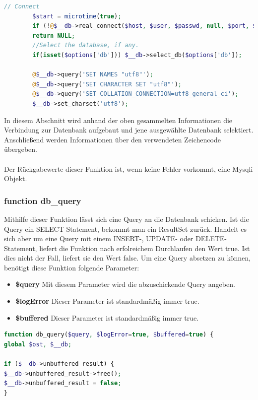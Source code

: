 \begin{lstlisting}[language=PHP, caption=mysqli.php/function-db\_connect4, firstnumber=63]
	    // Connect
	    $start = microtime(true);
	    if (!@$__db->real_connect($host, $user, $passwd, null, $port, $socket))
	    return NULL;
	    //Select the database, if any.
	    if(isset($options['db'])) $__db->select_db($options['db']);
	    
	    @$__db->query('SET NAMES "utf8"');
	    @$__db->query('SET CHARACTER SET "utf8"');
	    @$__db->query('SET COLLATION_CONNECTION=utf8_general_ci');
	    $__db->set_charset('utf8');
\end{lstlisting}
In diesem Abschnitt wird anhand der oben gesammelten Informationen die Verbindung zur Datenbank aufgebaut und jene ausgewählte Datenbank selektiert.\\
Anschließend werden Informationen über den verwendeten Zeichencode übergeben.\\
\\
Der Rückgabewerte dieser Funktion ist, wenn keine Fehler vorkommt, eine Mysqli Objekt. 
\newpage

\subsubsection{function db\_query}

Mithilfe dieser Funktion lässt sich eine Query an die Datenbank schicken. Ist die Query ein SELECT Statement, bekommt man ein ResultSet zurück. Handelt es sich aber um eine Query mit einem INSERT-, UPDATE- oder DELETE- Statement, liefert die Funktion nach erfolreichem Durchlaufen den Wert true. Ist dies nicht der Fall, liefert sie den Wert false. Um eine Query absetzen zu können, benötigt diese Funktion folgende Parameter:
\begin{itemize}
	\item \textbf{\$query} Mit diesem Parameter wird die abzuschickende Query angeben.
	\item \textbf{\$logError} Dieser Parameter ist standardmäßig immer true.
	\item \textbf{\$buffered} Dieser Parameter ist standardmäßig immer true.
\end{itemize}

\begin{lstlisting}[language=PHP, caption=mysqli.php/function-db\_query1, firstnumber=154]
function db_query($query, $logError=true, $buffered=true) {
global $ost, $__db;

if ($__db->unbuffered_result) {
$__db->unbuffered_result->free();
$__db->unbuffered_result = false;
}
\end{lstlisting}

